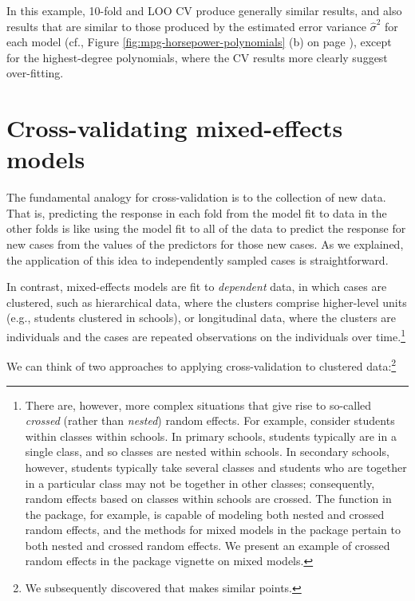 \documentclass[
]{jss}
\begin{document}
In this example, 10-fold and LOO CV produce generally similar results,
and also results that are similar to those produced by the estimated
error variance \(\widehat{\sigma}^2\) for each model (cf., Figure
\ref{fig:mpg-horsepower-polynomials} (b) on page
\pageref{fig:mpg-horsepower-polynomials}), except for the highest-degree
polynomials, where the CV results more clearly suggest over-fitting.
\newpage

\section{Cross-validating mixed-effects
models}\label{cross-validating-mixed-effects-models}

The fundamental analogy for cross-validation is to the collection of new
data. That is, predicting the response in each fold from the model fit
to data in the other folds is like using the model fit to all of the
data to predict the response for new cases from the values of the
predictors for those new cases. As we explained, the application of this
idea to independently sampled cases is straightforward.

In contrast, mixed-effects models are fit to \emph{dependent} data, in
which cases are clustered, such as hierarchical data, where the clusters
comprise higher-level units (e.g., students clustered in schools), or
longitudinal data, where the clusters are individuals and the cases are
repeated observations on the individuals over time.\footnote{There are,
  however, more complex situations that give rise to so-called
  \emph{crossed} (rather than \emph{nested}) random effects. For
  example, consider students within classes within schools. In primary
  schools, students typically are in a single class, and so classes are
  nested within schools. In secondary schools, however, students
  typically take several classes and students who are together in a
  particular class may not be together in other classes; consequently,
  random effects based on classes within schools are crossed. The
   function in the  package, for example, is
  capable of modeling both nested and crossed random effects, and the
   methods for mixed models in the  package pertain
  to both nested and crossed random effects. We present an example of
  crossed random effects in the  package vignette on mixed
  models.}

We can think of two approaches to applying cross-validation to clustered
data:\footnote{We subsequently discovered that \citet[Section
  8]{Vehtari:2023} makes similar points.}
\end{document}
